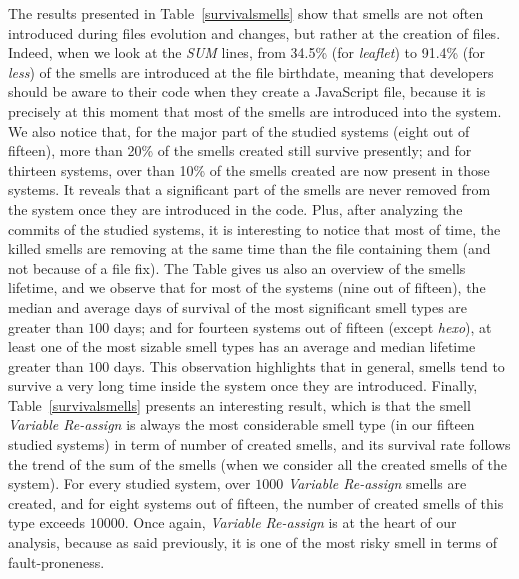 {The results presented in Table~\ref{survivalsmells} show that smells are not often introduced during files evolution and changes, but rather at the creation of files. Indeed, when we look at the \textsl{SUM} lines, from 34.5\% (for \textsl{leaflet}) to 91.4\% (for \textsl{less}) of the smells are introduced at the file birthdate, meaning that developers should be aware to their code when they create a JavaScript file, because it is precisely at this moment that most of the smells are introduced into the system. We also notice that, for the major part of the studied systems (eight out of fifteen), more than 20\% of the smells created still survive presently; and for thirteen systems, over than 10\% of the smells created are now present in those systems. It reveals that a significant part of the smells are never removed from the system once they are introduced in the code. Plus, after analyzing the commits of the studied systems, it is interesting to notice that most of time, the killed smells are removing at the same time than the file containing them (and not because of a file fix). The Table gives us also an overview of the smells lifetime, and we observe that for most of the systems (nine out of fifteen), the median and average days of survival of the most significant smell types are greater than $100$ days; and for fourteen systems out of fifteen (except \textsl{hexo}), at least one of the most sizable smell types has an average and median lifetime greater than $100$ days. This observation highlights that in general, smells tend to survive a very long time inside the system once they are introduced. Finally, Table~\ref{survivalsmells} presents an interesting result, which is that the smell \textsl{Variable Re-assign} is always the most considerable smell type (in our fifteen studied systems) in term of number of created smells, and its survival rate follows the trend of the sum of the smells (when we consider all the created smells of the system). For every studied system, over $1000$ \textsl{Variable Re-assign} smells are created, and for eight systems out of fifteen, the number of created smells of this type exceeds $10000$. Once again, \textsl{Variable Re-assign} is at the heart of our analysis, because as said previously, it is one of the most risky smell in terms of fault-proneness.
}
